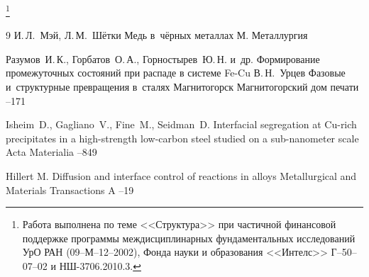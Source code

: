 {\thanks{Работа выполнена по теме <<Структура>> при частичной финансовой поддержке программы междисциплинарных фундаментальных исследований УрО РАН {\rm (09--М--12--2002),} Фонда науки и образования <<Интелс>> {\rm Г--50--07--02} и {\rm НШ-3706.2010.3.}}}



\begin{thebibliography}{9}
\ed И.\,Л.~Мэй, Л.\,М.~Шётки
\book  Медь в~чёрных металлах
\publaddr М.
\publ Металлургия

\by Разумов~И.\,К., Горбатов~О.\,А., Горностырев~Ю.\,Н. и~др.
\paper Формирование промежуточных состояний при распаде в системе Fe-Cu
\ed В.\,Н.~Урцев
\inbook Фазовые и~структурные превращения в~сталях
\publaddr Магнитогорск
\publ Магнитогорский дом печати
--171

\by Isheim~D., Gagliano~V., Fine~M., Seidman~D.
\paper Interfacial segregation at Cu-rich precipitates in a high-strength low-carbon steel studied on a sub-nanometer scale
\jour Acta Materialia
--849

\by Hillert M.
\paper Diffusion and interface control of reactions in alloys
\jour Metallurgical and Materials Transactions A
--19
\end{thebibliography}

\makeengtitle

%







